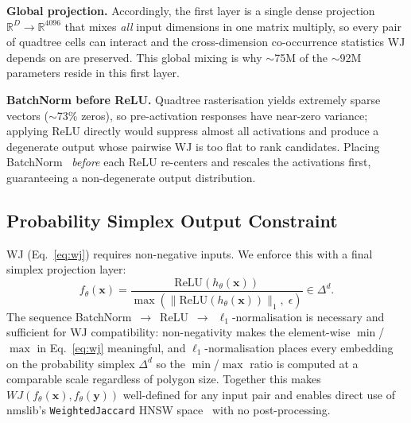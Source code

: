 \documentclass[sigconf]{acmart}
\begin{document}
\noindent\textbf{Global projection.} Accordingly, the first layer is a single dense
projection $\mathbb{R}^{D}\!\to\!\mathbb{R}^{4096}$ that mixes \emph{all} input
dimensions in one matrix multiply, so every pair of quadtree cells can interact and
the cross-dimension co-occurrence statistics WJ depends on are preserved. This
global mixing is why $\sim$75M of the $\sim$92M parameters reside in this first
layer.

\noindent\textbf{BatchNorm before ReLU.} Quadtree rasterisation yields extremely
sparse vectors ($\sim$73\% zeros), so pre-activation responses have near-zero
variance; applying ReLU directly would suppress almost all activations and produce a
degenerate output whose pairwise WJ is too flat to rank candidates. Placing
BatchNorm~\cite{ioffe15bn} \emph{before} each ReLU re-centers and rescales the
activations first, guaranteeing a non-degenerate output distribution.

\subsection{Probability Simplex Output Constraint}
\label{sec:simplex}
WJ (Eq.~\ref{eq:wj}) requires non-negative inputs. We enforce this with a final
simplex projection layer:
\begin{equation}
  f_\theta(\mathbf{x}) = \frac{\mathrm{ReLU}(h_\theta(\mathbf{x}))}
       {\max(\|\mathrm{ReLU}(h_\theta(\mathbf{x}))\|_1,\;\epsilon)} \in \Delta^{d}.
  \label{eq:simplex}
\end{equation}
The sequence BatchNorm~$\to$~ReLU~$\to$~$\ell_1$-normalisation is necessary and
sufficient for WJ compatibility: non-negativity makes the element-wise $\min$/$\max$
in Eq.~\ref{eq:wj} meaningful, and $\ell_1$-normalisation places every embedding on
the probability simplex $\Delta^{d}$ so the $\min$/$\max$ ratio is computed at a
comparable scale regardless of polygon size. Together this makes
$WJ(f_\theta(\mathbf{x}),f_\theta(\mathbf{y}))$ well-defined for any input pair and
enables direct use of nmslib's \texttt{WeightedJaccard} HNSW
space~\cite{shape2vec,boytsov13} with no post-processing.
\end{document}
